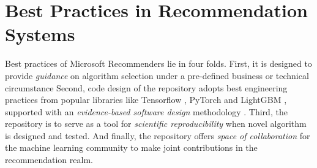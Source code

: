 \section{Best Practices in Recommendation Systems}

Best practices of Microsoft Recommenders lie in four folds.
First, it is designed to provide {\em guidance} on 
algorithm selection under a pre-defined business or technical circumstance
Second, code design of the repository adopts best engineering practices from popular libraries like Tensorflow 
\cite{abadi2016tensorflow}, PyTorch \cite{paszke2017automatic} and LightGBM 
\cite{ke2017lightgbm}, supported with an {\em evidence-based software design} methodology 
\cite{joeglekar2018evidence}. Third, the repository
is to serve as a tool for {\em scientific reproducibility} when novel algorithm is designed and tested. And finally, the repository offers {\em space of collaboration} for the machine learning community to make
joint contributions in the recommendation realm. 





